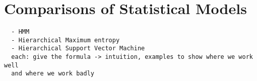 \section{Comparisons of Statistical Models}\label{sec:stats}
\begin{verbatim}
  - HMM
  - Hierarchical Maximum entropy
  - Hierarchical Support Vector Machine
  each: give the formula -> intuition, examples to show where we work well 
  and where we work badly
\end{verbatim}
